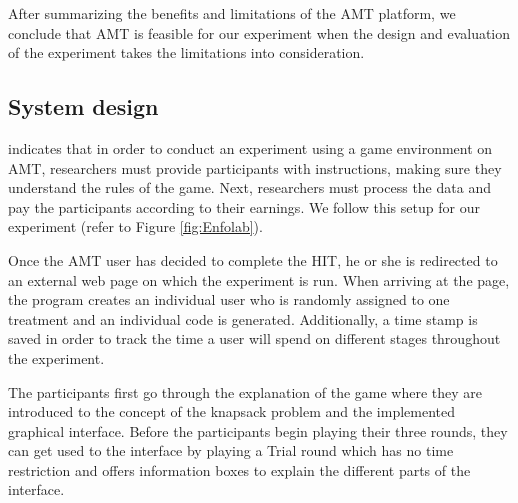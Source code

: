 After summarizing the benefits and limitations of the \ac{AMT} platform, we conclude that \ac{AMT} is feasible for our experiment when the design and evaluation of the experiment takes the limitations into consideration.

\subsection{System design}

\cite{Rand2012} indicates that in order to conduct an experiment using a game environment on \ac{AMT}, researchers must provide participants with instructions, making sure they understand the rules of the game. Next, researchers must process the data and pay the participants according to their earnings. We follow this setup for our experiment (refer to Figure \ref{fig:Enfolab}).

Once the \ac{AMT} user has decided to complete the \ac{HIT}, he or she is redirected to an external web page on which the experiment is run.
When arriving at the page, the program creates an individual user who is randomly assigned to one treatment and an individual code is generated. 
Additionally, a time stamp is saved in order to track the time a user will spend on different stages throughout the experiment.

The participants first go through the explanation of the game where they are introduced to the concept of the knapsack problem and the implemented graphical interface. 
Before the participants begin playing their three rounds, they can get used to the interface by playing a Trial round which has no time restriction and offers information boxes to explain the different parts of the interface.

